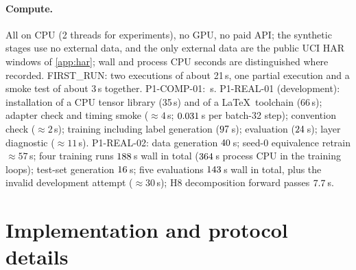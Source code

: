 \documentclass{article}
\theoremstyle{plain}
\theoremstyle{definition}
\theoremstyle{remark}
\begin{document}
\paragraph{Compute.}
All on CPU (2 threads for experiments), no GPU, no paid API; the synthetic stages use no external data, and the only external data are the public UCI HAR windows of \cref{app:har}; wall and process CPU seconds are distinguished where recorded.
FIRST\_RUN: two executions of about 21\,s, one partial execution and a smoke test of about 3\,s together.
P1-COMP-01: \CompSeconds\,s.
P1-REAL-01 (development): installation of a CPU tensor library (35\,s) and of a \LaTeX\ toolchain (66\,s); adapter check and timing smoke (${\approx}4$\,s; $0.031$\,s per batch-32 step); convention check (${\approx}2$\,s); training including label generation ($97$\,s); evaluation ($24$\,s); layer diagnostic (${\approx}11$\,s).
P1-REAL-02: data generation $40$\,s; seed-0 equivalence retrain ${\approx}57$\,s; four training runs $188$\,s wall in total ($364$\,s process CPU in the training loops); test-set generation $16$\,s; five evaluations $143$\,s wall in total, plus the invalid development attempt (${\approx}30$\,s); H8 decomposition forward passes $7.7$\,s.



\FloatBarrier
\section{Implementation and protocol details}
\label{app:real}
\end{document}

